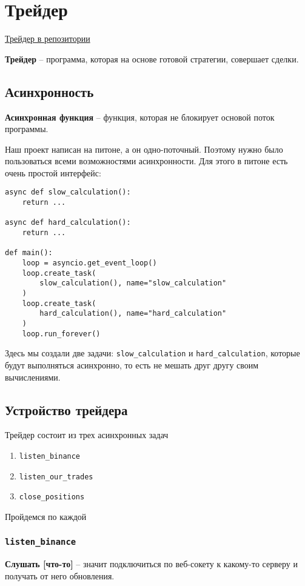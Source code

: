 \section{Трейдер}
\hyperlink{https://github.com/dexety/dex-trading-system/blob/main/strategy/arbitrage/trader.py}{Трейдер в репозитории}

 \textbf{Трейдер} -- программа, которая на основе готовой стратегии, совершает сделки.

\subsection{Асинхронность}

 \textbf{Асинхронная функция} -- функция, которая не блокирует основой поток программы.

Наш проект написан на питоне, а он одно-поточный. Поэтому нужно было пользоваться всеми возможностями асинхронности. Для этого в питоне есть очень простой интерфейс:

\begin{verbatim}
async def slow_calculation():
    return ...
    
async def hard_calculation():
    return ...
    
def main():
    loop = asyncio.get_event_loop()
    loop.create_task(
        slow_calculation(), name="slow_calculation"
    )
    loop.create_task(
        hard_calculation(), name="hard_calculation"
    )
    loop.run_forever()
\end{verbatim}

Здесь мы создали две задачи: \texttt{slow\_calculation} и  \texttt{hard\_calculation}, которые будут выполняться асинхронно, то есть не мешать друг другу своим вычислениями.


\subsection{Устройство трейдера}

Трейдер состоит из трех асинхронных задач

\begin{enumerate}
    \item \texttt{listen\_binance}
    \item \texttt{listen\_our\_trades}
    \item \texttt{close\_positions}
\end{enumerate}

Пройдемся по каждой

\subsubsection{\texttt{listen\_binance}}
 \textbf{Слушать [что-то]} -- значит подключиться по веб-сокету к какому-то серверу и получать от него обновления.

